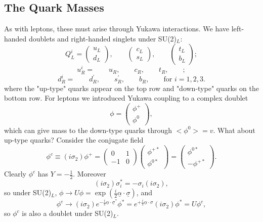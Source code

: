 \subsection{The Quark Masses}
%
As with leptons, these must arise through Yukawa interactions. We have left-handed doublets and right-handed singlets under SU(2)$_L$:
\[ Q_L^i = \left( \begin{array}{cc}
u_L   \\
d_L  \end{array} \right), \qquad
\left( \begin{array}{cc}
c_L   \\
s_L   \end{array} \right), \qquad
\left( \begin{array}{cc}
t_L   \\
b_L   \end{array} \right);\]
\[ 
u_R^i = \qquad u_R, \qquad c_R, \qquad t_R, \qquad;
\]
\[ 
d_R^i = \qquad d^\prime_R, \qquad s^\prime_R, \qquad b_R, \qquad \text{for } i=1,2,3.
\]
where the "up-type" quarks appear on the top row and "down-type" quarks on the bottom row. For leptons we introduced Yukawa coupling to a complex doublet
\[\phi = \left( \begin{array}{cc}
\phi^+ \\
\phi^0 \end{array} \right),
\]
which can give mass to the down-type quarks through $<\phi^0> = v$. What about up-type quarks? Consider the conjugate field
\[
\phi^c \equiv (i\sigma_2)\phi^+ = \left( \begin{array}{cc}
0 & 1   \\
-1 & 0  \end{array} \right) 
\left( \begin{array}{cc}
\phi^{+ *}   \\
\phi^{0 *}  \end{array} \right) = 
\left( \begin{array}{cc}
\phi^{0 *}   \\
-\phi^{+ *}  \end{array} \right).
\]
Clearly $\phi^c$ has $Y = - \frac{1}{2}$. Moreover
\begin{equation}
(i\sigma_2)\sigma_i^* = -\sigma_i(i\sigma_2),
\end{equation}
so under SU(2)$_L$, $\phi \to U \phi = \exp(\frac{i}{2}\underline{\alpha}\cdot \underline{\sigma})$, and
\begin{equation}
\phi^c \to (i\sigma_2)e^{-\frac{i}{2}\underline{\alpha}\cdot\underline{\sigma}^*} \phi^* = e^{+\frac{i}{2}\underline{\alpha}\cdot{\sigma}}(i\sigma_2)\phi^* = U \phi^c,
\end{equation}
so $\phi^c$ is also a doublet under SU(2)$_L$.

